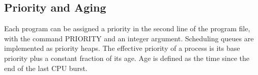 \documentclass[paper=a4, fontsize=11pt]{scrartcl} %
\numberwithin{equation}{section} %
\numberwithin{figure}{section} %
\numberwithin{table}{section} %
\begin{document}
\subsection{Priority and Aging}
Each program can be assigned a priority in the second line of the program file, with the command PRIORITY and an integer argument. Scheduling queues are implemented as priority heaps. The effective priority of a process is its base priority plus a constant fraction of its age. Age is defined as the time since the end of the last CPU burst.
\end{document}
